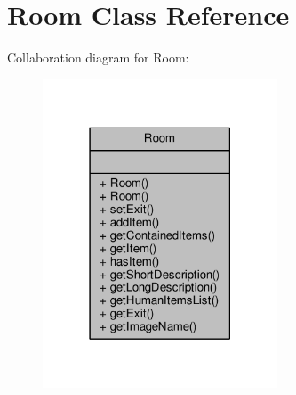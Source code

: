 \hypertarget{classRoom}{\section{Room Class Reference}
\label{classRoom}
}


Collaboration diagram for Room\-:
\nopagebreak
\begin{figure}[H]
\begin{center}
\leavevmode
\includegraphics[width=198pt]{classRoom__coll__graph}
\end{center}
\end{figure}
